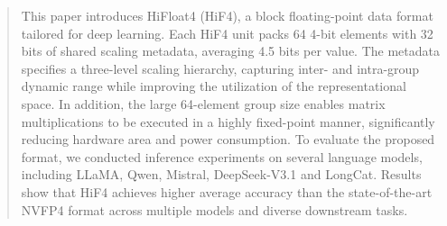 \begin{abstract}

This paper introduces HiFloat4 (HiF4), a block floating-point data 
format tailored for deep learning. 
Each HiF4 unit packs 64 4-bit elements with 32 bits of shared scaling 
metadata, averaging 4.5 bits per value. 
The metadata specifies a three-level scaling hierarchy, 
capturing inter- and intra-group dynamic range while improving the 
utilization of the representational space. 
In addition, the large 64-element group size enables matrix 
multiplications to be executed in a highly fixed-point manner, 
significantly reducing hardware area and power consumption. 
To evaluate the proposed format, we conducted inference experiments 
on several language models, 
including LLaMA, Qwen, Mistral, DeepSeek-V3.1 and LongCat. 
Results show that HiF4 achieves higher average accuracy than the 
state-of-the-art NVFP4 format across multiple models and diverse 
downstream tasks.
\end{abstract}